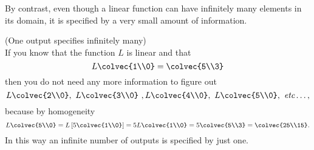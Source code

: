 By contrast, even though a linear function can have infinitely many elements in its domain, it is specified by a very small amount of information. 

\begin{example} (One output specifies infinitely many)\\ 
If you know that the function $L$ is linear and that 
\[L\colvec{1\\0}  =\colvec{5\\3}\] 
then you do not need any more information to figure out 
\[L\colvec{2\\0},~L\colvec{3\\0}~,L\colvec{4\\0},~L\colvec{5\\0} ,\text{\itshape~etc}\ldots, \] 
because by homogeneity
\[L\colvec{5\\0}=L\left[ 5\colvec{1\\0} \right] = 5 L\colvec{1\\0}=5\colvec{5\\3}=\colvec{25\\15}.\]
In this way an infinite number of outputs is specified by just one.
\end{example}

